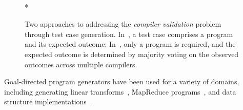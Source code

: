 \begin{figure}
	\centering
	\\*
	\caption[Generating and evaluating compiler test cases]{%
		Two approaches to addressing the \emph{compiler validation} problem through test case generation. In~\protect{}, a test case comprises a program and its expected outcome. In~\protect{}, only a program is required, and the expected outcome is determined by majority voting on the observed outcomes across multiple compilers.%
	}%
	\label{fig:test-case-generators}
\end{figure}

Goal-directed program generators have been used for a variety of domains, including 
generating linear transforms~\cite{Voronenko2009},
MapReduce programs~\cite{Smith},
and data structure implementations~\cite{Loncaric2016}.



